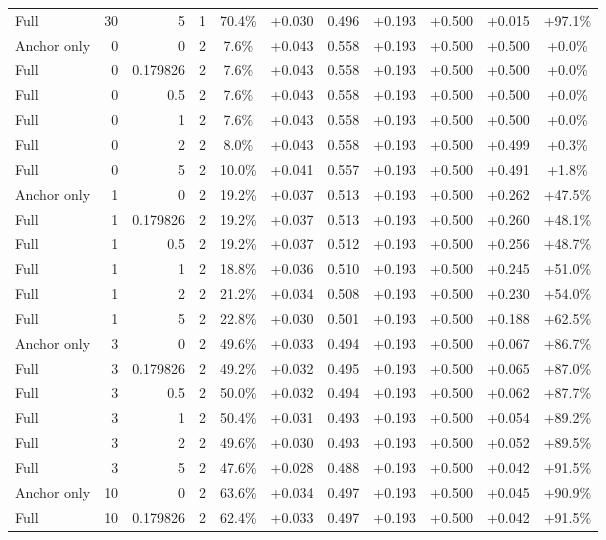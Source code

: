 \begin{table}[htbp]
\begin{tabular}{lrrrccccccc}
Full & 30 & 5 & 1 & 70.4\% & +0.030 & 0.496 & +0.193 & +0.500 & +0.015 & +97.1\% \\
Anchor only & 0 & 0 & 2 & 7.6\% & +0.043 & 0.558 & +0.193 & +0.500 & +0.500 & +0.0\% \\
Full & 0 & 0.179826 & 2 & 7.6\% & +0.043 & 0.558 & +0.193 & +0.500 & +0.500 & +0.0\% \\
Full & 0 & 0.5 & 2 & 7.6\% & +0.043 & 0.558 & +0.193 & +0.500 & +0.500 & +0.0\% \\
Full & 0 & 1 & 2 & 7.6\% & +0.043 & 0.558 & +0.193 & +0.500 & +0.500 & +0.0\% \\
Full & 0 & 2 & 2 & 8.0\% & +0.043 & 0.558 & +0.193 & +0.500 & +0.499 & +0.3\% \\
Full & 0 & 5 & 2 & 10.0\% & +0.041 & 0.557 & +0.193 & +0.500 & +0.491 & +1.8\% \\
Anchor only & 1 & 0 & 2 & 19.2\% & +0.037 & 0.513 & +0.193 & +0.500 & +0.262 & +47.5\% \\
Full & 1 & 0.179826 & 2 & 19.2\% & +0.037 & 0.513 & +0.193 & +0.500 & +0.260 & +48.1\% \\
Full & 1 & 0.5 & 2 & 19.2\% & +0.037 & 0.512 & +0.193 & +0.500 & +0.256 & +48.7\% \\
Full & 1 & 1 & 2 & 18.8\% & +0.036 & 0.510 & +0.193 & +0.500 & +0.245 & +51.0\% \\
Full & 1 & 2 & 2 & 21.2\% & +0.034 & 0.508 & +0.193 & +0.500 & +0.230 & +54.0\% \\
Full & 1 & 5 & 2 & 22.8\% & +0.030 & 0.501 & +0.193 & +0.500 & +0.188 & +62.5\% \\
Anchor only & 3 & 0 & 2 & 49.6\% & +0.033 & 0.494 & +0.193 & +0.500 & +0.067 & +86.7\% \\
Full & 3 & 0.179826 & 2 & 49.2\% & +0.032 & 0.495 & +0.193 & +0.500 & +0.065 & +87.0\% \\
Full & 3 & 0.5 & 2 & 50.0\% & +0.032 & 0.494 & +0.193 & +0.500 & +0.062 & +87.7\% \\
Full & 3 & 1 & 2 & 50.4\% & +0.031 & 0.493 & +0.193 & +0.500 & +0.054 & +89.2\% \\
Full & 3 & 2 & 2 & 49.6\% & +0.030 & 0.493 & +0.193 & +0.500 & +0.052 & +89.5\% \\
Full & 3 & 5 & 2 & 47.6\% & +0.028 & 0.488 & +0.193 & +0.500 & +0.042 & +91.5\% \\
Anchor only & 10 & 0 & 2 & 63.6\% & +0.034 & 0.497 & +0.193 & +0.500 & +0.045 & +90.9\% \\
Full & 10 & 0.179826 & 2 & 62.4\% & +0.033 & 0.497 & +0.193 & +0.500 & +0.042 & +91.5\% \\

\end{tabular}
\end{table}
